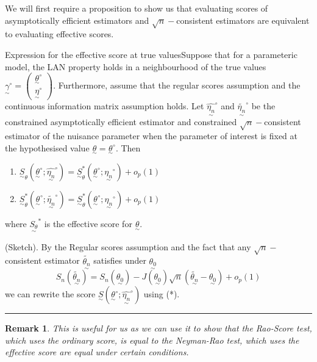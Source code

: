 \documentclass[twoside]{article}
\newtheorem{remark}[theorem]{Remark}
\newenvironment{proof}{{\bf Proof:}}{\hfill\rule{2mm}{2mm}}
\newcommand{\utilde}{\underset{\sim}}
\begin{document}
We will first require a proposition to show us that evaluating scores of asymptotically efficient estimators and $\sqrt{n}-$consistent estimators are equivalent to evaluating effective scores.
\begin{proposition_exam}{Expression for the effective score at true values}{}Suppose that for a parameteric model, the LAN property holds in a neighbourhood of the true values $\utilde{\gamma}^{\circ} = \begin{pmatrix}\utilde{\theta}^{\circ}\\ \utilde{\eta}^{\circ}  \end{pmatrix}$. Furthermore, assume that the regular scores assumption and the continuous information matrix assumption holds. Let $\hat{\utilde{\eta_n}}^{\circ}$ and $\tilde{\utilde{\eta_n}}^{\circ}$ be the constrained asymptotically efficient estimator and constrained $\sqrt{n}-$consistent estimator of the nuisance parameter when the parameter of interest is fixed at the hypothesised value $\utilde{\theta} = \utilde{\theta}^{\circ}.$ Then 
\begin{enumerate}
\item $\utilde{S}_{\theta}(\utilde{\theta}^{\circ};\hat{\utilde{\eta_{n}}}^{\circ}) = \utilde{S}_{\theta}^{*}(\utilde{\theta}^{\circ};\utilde{\eta_{n}}^{\circ}) + o_p(1)$
\item $\utilde{S}_{\theta}^{*}(\utilde{\theta}^{\circ};\tilde{\utilde{\eta_{n}}}^{\circ}) = \utilde{S}_{\theta}^{*}(\utilde{\theta}^{\circ};\utilde{\eta_{n}}^{\circ}) + o_p(1)$
\end{enumerate}
where $\utilde{S_{\theta}}^{*}$ is the effective score for $\utilde{\theta}.$
\end{proposition_exam}


\begin{proof}(Sketch). By the Regular scores assumption and the fact that any $\sqrt{n}-$consistent estimator $\tilde{\utilde{\theta_n}}$ satisfies under $\utilde{\theta_0}$
\begin{equation}
S_n(\tilde{\utilde{\theta_n}}) = S_n(\utilde{\theta_0}) - J(\utilde{\theta_0})\sqrt{n}(\tilde{\utilde{\theta_n}} - \utilde{\theta_0}) + o_p(1)
\tag{*}
\end{equation}
we can rewrite the score $\utilde{S}(\utilde{\theta}^{\circ};\hat{\utilde{\eta_{n}}}^{\circ})$ using (*).
\end{proof}

\begin{remark}This is useful for us as we can use it to show that the Rao-Score test, which uses the ordinary score, is equal to the Neyman-Rao test, which uses the effective score are equal under certain conditions.
\end{remark}
\end{document}
